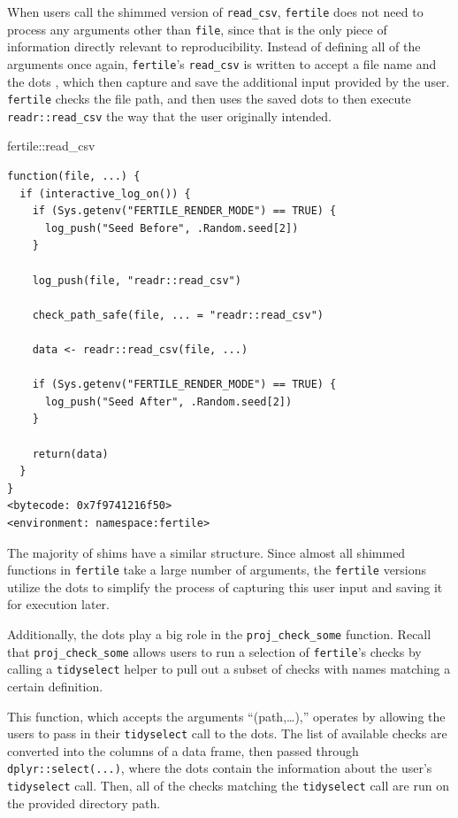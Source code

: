\documentclass[12pt,twoside]{reedthesis}
\newenvironment{Shaded}{\begin{snugshade}}{\end{snugshade}}
\newcommand{\NormalTok}[1]{#1}
\newcommand{\SpecialCharTok}[1]{\textcolor[rgb]{0.00,0.00,0.00}{#1}}
\begin{document}
When users call the shimmed version of \texttt{read\_csv}, \texttt{fertile} does not need to process any arguments other than \texttt{file}, since that is the only piece of information directly relevant to reproducibility. Instead of defining all of the arguments once again, \texttt{fertile}'s \texttt{read\_csv} is written to accept a file name and the dots , which then capture and save the additional input provided by the user. \texttt{fertile} checks the file path, and then uses the saved dots to then execute \texttt{readr::read\_csv} the way that the user originally intended.
\begin{Shaded}
\begin{Highlighting}[]
\NormalTok{fertile}\SpecialCharTok{::}\NormalTok{read\_csv}
\end{Highlighting}
\end{Shaded}
\begin{verbatim}
function(file, ...) {
  if (interactive_log_on()) {
    if (Sys.getenv("FERTILE_RENDER_MODE") == TRUE) {
      log_push("Seed Before", .Random.seed[2])
    }

    log_push(file, "readr::read_csv")

    check_path_safe(file, ... = "readr::read_csv")

    data <- readr::read_csv(file, ...)

    if (Sys.getenv("FERTILE_RENDER_MODE") == TRUE) {
      log_push("Seed After", .Random.seed[2])
    }

    return(data)
  }
}
<bytecode: 0x7f9741216f50>
<environment: namespace:fertile>
\end{verbatim}
The majority of shims have a similar structure. Since almost all shimmed functions in \texttt{fertile} take a large number of arguments, the \texttt{fertile} versions utilize the dots to simplify the process of capturing this user input and saving it for execution later.

Additionally, the dots play a big role in the \texttt{proj\_check\_some} function. Recall that \texttt{proj\_check\_some} allows users to run a selection of \texttt{fertile}'s checks by calling a \texttt{tidyselect} helper to pull out a subset of checks with names matching a certain definition.

This function, which accepts the arguments ``(path,\ldots),'' operates by allowing the users to pass in their \texttt{tidyselect} call to the dots. The list of available checks are converted into the columns of a data frame, then passed through \texttt{dplyr::select(...)}, where the dots contain the information about the user's \texttt{tidyselect} call. Then, all of the checks matching the \texttt{tidyselect} call are run on the provided directory path.
\end{document}
